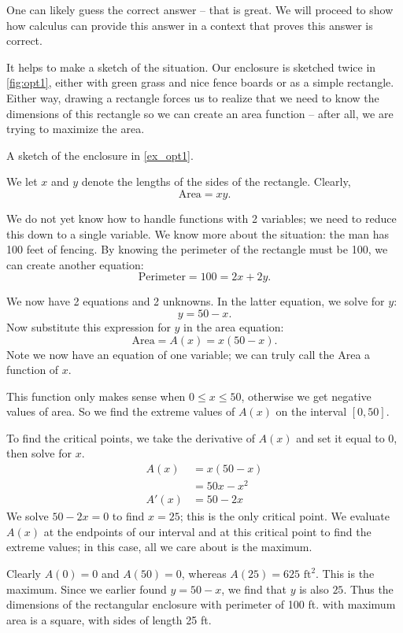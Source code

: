 {One can likely guess the correct answer -- that is great. We will proceed to show how calculus can provide this answer in a context that proves this answer is correct.

It helps to make a sketch of the situation. Our enclosure is sketched twice in \autoref{fig:opt1}, either with green grass and nice fence boards or as a simple rectangle. Either way, drawing a rectangle forces us to realize that we need to know the dimensions of this rectangle so we can create an area function -- after all, we are trying to maximize the area.

{\noindent\begin{center}
\captionsetup{type=figure}%
\caption{A sketch of the enclosure in \autoref{ex_opt1}.}\label{fig:opt1}
\end{center}
} %
{
} %


We let $x$ and $y$ denote the lengths of the sides of the rectangle. Clearly, $$\text{Area}=xy.$$

We do not yet know how to handle functions with 2 variables; we need to reduce this down to a single variable. We know more about the situation: the man has 100 feet of fencing. By knowing the perimeter of the rectangle must be 100, we can create another equation: $$\text{Perimeter} = 100 = 2x+2y.$$

We now have 2 equations and 2 unknowns. In the latter equation, we solve for $y$:
$$y = 50-x.$$ Now substitute this expression for $y$ in the area equation:
$$ \text{Area} = A(x) = x(50-x).$$ Note we now have an equation of one variable; we can truly call the Area a function of $x$. 

This function only makes sense when $0\leq x \leq 50$, otherwise we get negative values of area. So we find the extreme values of $A(x)$ on the interval $[0,50]$. 

To find the critical points, we take the derivative of $A(x)$ and set it equal to 0, then solve for $x$.
\begin{align*}
A(x) &= x(50-x) \\
			&= 50x-x^2 \\
A'(x) 	&= 50-2x
\end{align*}
We solve $50-2x=0$ to find $x=25$; this is the only critical point. We evaluate $A(x)$ at the endpoints of our interval and at this critical point to find the extreme values; in this case, all we care about is the maximum.

Clearly $A(0)=0$ and $A(50)=0$, whereas $A(25) = 625 \text{ ft}^2$. This is the maximum. Since we earlier found $y = 50-x$, we find that $y$ is also $25$. Thus the dimensions of the rectangular enclosure with perimeter of 100 ft. with maximum area is a square, with sides of length 25 ft.}

